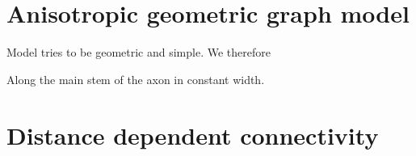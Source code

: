 











\clearpage
\section{Anisotropic geometric graph model}\label{sec:network_model}

Model tries to be geometric and simple. We therefore

Along the main stem of the axon in constant width. %

\newpage
\section{Distance dependent connectivity}\label{sec:dist_depend_con}


